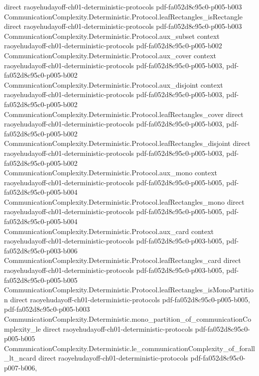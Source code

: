 \begin{theorem}
  {direct}
  {raoyehudayoff-ch01-deterministic-protocols}
  {pdf-fa052d8c95c0-p005-b003}
\proofstep
  {CommunicationComplexity.Deterministic.Protocol.leafRectangles_isRectangle}
  {direct}
  {raoyehudayoff-ch01-deterministic-protocols}
  {pdf-fa052d8c95c0-p005-b003}
\proofstep
  {CommunicationComplexity.Deterministic.Protocol.aux_subset}
  {context}
  {raoyehudayoff-ch01-deterministic-protocols}
  {pdf-fa052d8c95c0-p005-b002}
\proofstep
  {CommunicationComplexity.Deterministic.Protocol.aux_cover}
  {context}
  {raoyehudayoff-ch01-deterministic-protocols}
  {pdf-fa052d8c95c0-p005-b003,
    pdf-fa052d8c95c0-p005-b002}
\proofstep
  {CommunicationComplexity.Deterministic.Protocol.aux_disjoint}
  {context}
  {raoyehudayoff-ch01-deterministic-protocols}
  {pdf-fa052d8c95c0-p005-b003,
    pdf-fa052d8c95c0-p005-b002}
\proofstep
  {CommunicationComplexity.Deterministic.Protocol.leafRectangles_cover}
  {direct}
  {raoyehudayoff-ch01-deterministic-protocols}
  {pdf-fa052d8c95c0-p005-b003,
    pdf-fa052d8c95c0-p005-b002}
\proofstep
  {CommunicationComplexity.Deterministic.Protocol.leafRectangles_disjoint}
  {direct}
  {raoyehudayoff-ch01-deterministic-protocols}
  {pdf-fa052d8c95c0-p005-b003,
    pdf-fa052d8c95c0-p005-b002}
\proofstep
  {CommunicationComplexity.Deterministic.Protocol.aux_mono}
  {context}
  {raoyehudayoff-ch01-deterministic-protocols}
  {pdf-fa052d8c95c0-p005-b005,
    pdf-fa052d8c95c0-p005-b004}
\proofstep
  {CommunicationComplexity.Deterministic.Protocol.leafRectangles_mono}
  {direct}
  {raoyehudayoff-ch01-deterministic-protocols}
  {pdf-fa052d8c95c0-p005-b005,
    pdf-fa052d8c95c0-p005-b004}
\proofstep
  {CommunicationComplexity.Deterministic.Protocol.aux_card}
  {context}
  {raoyehudayoff-ch01-deterministic-protocols}
  {pdf-fa052d8c95c0-p003-b005,
    pdf-fa052d8c95c0-p003-b006}
\proofstep
  {CommunicationComplexity.Deterministic.Protocol.leafRectangles_card}
  {direct}
  {raoyehudayoff-ch01-deterministic-protocols}
  {pdf-fa052d8c95c0-p003-b005,
    pdf-fa052d8c95c0-p005-b005}
\proofstep
  {CommunicationComplexity.Deterministic.Protocol.leafRectangles_isMonoPartition}
  {direct}
  {raoyehudayoff-ch01-deterministic-protocols}
  {pdf-fa052d8c95c0-p005-b005,
    pdf-fa052d8c95c0-p005-b003}
\proofstep
  {CommunicationComplexity.Deterministic.mono_partition_of_communicationComplexity_le}
  {direct}
  {raoyehudayoff-ch01-deterministic-protocols}
  {pdf-fa052d8c95c0-p005-b005}
\proofstep
  {CommunicationComplexity.Deterministic.le_communicationComplexity_of_forall_lt_ncard}
  {direct}
  {raoyehudayoff-ch01-deterministic-protocols}
  {pdf-fa052d8c95c0-p007-b006,
}
\end{theorem}

